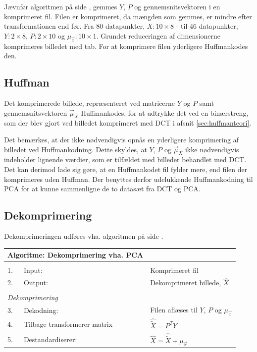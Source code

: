 Jævnfør algoritmen på side \pageref{tb:Algoritme-Komprimering-PCA}, gemmes $Y$, $P$ og gennemsnitsvektoren i en komprimeret fil. Filen er komprimeret, da mængden som gemmes, er mindre efter transformationen end før. Fra 80 datapunkter, $X: 10 \times 8$ - til 46 datapunkter, $Y: 2 \times 8$, $P: 2 \times 10$ og $\mu_{\vec{x}}: 10 \times 1$. Grundet reduceringen af dimensionerne komprimeres billedet med tab. For at komprimere filen yderligere Huffmankodes den.
\subsection*{Huffman}
Det komprimerede billede, repræsenteret ved matricerne $Y$ og $P$ samt gennemsnitsvektoren $\vec{\mu}_X$ Huffmankodes, for at udtrykke det ved en binærstreng, som der blev gjort ved billedet komprimeret med DCT i afsnit \vref{sec:huffmanteori}.

Det bemærkes, at der ikke nødvendigvis opnås en yderligere komprimering af billedet ved Huffmankodning. Dette skyldes, at $Y$, $P$ og $\vec{\mu}_X$ ikke nødvendigvis indeholder lignende værdier, som er tilfældet med billeder behandlet med DCT. Det kan derimod lade sig gøre, at en Huffmankodet fil fylder mere, end filen der komprimeres uden Huffman. Der benyttes derfor udelukkende Huffmankodning til PCA for at kunne sammenligne de to datasæt fra DCT og PCA.

\subsection*{Dekomprimering} \label{PCA_dekomprimering}
Dekomprimeringen udføres vha. algoritmen på side \pageref{tb:Algoritme-Dekomprimering-PCA}.
\begin{table}[!h]
\centering
\begin{tabular}{lll}
\hline
\multicolumn{2}{l}{\textbf{Algoritme: Dekomprimering vha. PCA}}    &                                                                   \\ \hline
\\
\multicolumn{1}{|l}{1.}        & Input:                     & Komprimeret fil \\
\multicolumn{1}{|l}{2.}        & Output:                    & Dekomprimeret billede, $\hat{X}$ \\
                               &                            &                                                                   \\
\multicolumn{2}{|l}{\textit{Dekomprimering}}                 &                                                                   \\
\multicolumn{1}{|l}{3.}        & Dekodning:        		 & Filen aflæses til $Y$, $P$ og $\mu_{\vec{x}}$           \\
\multicolumn{1}{|l}{4.}        & Tilbage transformerer matrix & $\hat{\tilde{X}} = P^T Y$           \\
\multicolumn{1}{|l}{5.}        & Destandardiserer:			 & 
$\hat{X} = \hat{\tilde{X}} + \mu_{\vec{x}}$          \\
\end{tabular}
\label{tb:Algoritme-Dekomprimering-PCA}
\end{table}

